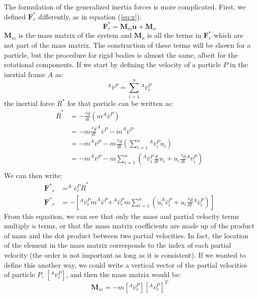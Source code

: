 \documentclass[twocolumn,10pt,final]{asme2e}
\begin{document}
The formulation of the generalized inertia forces is more complicated.
First, we defined $\mathbf{F}_r^*$ differently, as in equation (\ref{eq:x}).
\begin{equation}
\mathbf{F}_r^* = \mathbf{M}_m \mathbf{\dot{u}} + \mathbf{M}_n
\label{eq:x}
\end{equation}
$\mathbf{M}_m$ is the mass matrix of the system and $\mathbf{M}_n$ is all the
terms in $\mathbf{F}_r^*$ which are not part of the mass matrix. The
construction of these terms will be shown for a particle, but the procedure for
rigid bodies is almost the same, albeit for the rotational components.  If we
start by defining the velocity of a particle $P$ in the inertial frame $A$ as:
\begin{equation}
^{A}\bar{v}^{P} = \sum_{i=1}^{n} {} ^{A}\bar{v}_{r}^{P}
\end{equation}
the inertial force $R^*$ for that particle can be written as:
\begin{align}
\bar{R}^* &= -\frac{^{A} d}{dt}(m ^A\bar{v}^P) \\
&= -m \frac{^{A}d}{dt}^A\bar{v}^P - \dot{m} ^A\bar{v}^P \\
&= -\dot{m} ^A\bar{v}^P - m \frac{^{A}d}{dt}\left(\sum_{i=1}^{n}{} ^A
\bar{v}^P_i u_i \right) \\
&= -\dot{m} ^A\bar{v}^P - m \sum_{i=1}^{n} \left( ^A\bar{v}_i^P
\frac{d}{dt}u_i + u_i \frac{^{A}d}{dt} {}^A\bar{v}^P_i \right) \\
\end{align}
We can then write:
\begin{align}
\mathbf{F^*}_r &= ^A\bar{v}^P_r \bar{R}^{*} \\
\mathbf{F^*}_r &= - \left[
                   ^A\bar{v}^P_r \dot{m} ^A\bar{v}^P +
                   ^A\bar{v}^P_r m \sum_{i=1}^{n} \left(
                   \dot{u}_i ^A\bar{v}^P_i + u_i
                   \frac{^{A}d}{dt} {}^A\bar{v}^P_i
                   \right)
                   \right]
\end{align}
From this equation, we can see that only the mass and partial velocity
terms multiply $\dot{u}$ terms, or that the mass matrix coefficients are made
up of the product of mass and the dot product between two partial velocities.
In fact, the location of the element in the mass matrix corresponds to the
index of each partial velocity (the order is not important as long as it is
consistent).
If we wanted to define this another way, we could write a vertical vector of
the partial velocities of particle $P$, $[^A\bar{v}^P_r]$, and then the
mass matrix would be:
\begin{equation}
\mathbf{M}_m = -m \left[^A\bar{v}_r^P\right] \left[^A\bar{v}_r^P \right]^T
\end{equation}
\end{document}
